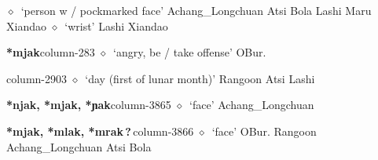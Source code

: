 \hspace{1ex}
         $\diamond$~`person w / pockmarked face'
         Achang\_Longchuan 
\hspace{1ex}
         Atsi 
\hspace{1ex}
         Bola 
\hspace{1ex}
         Lashi 
\hspace{1ex}
         Maru 
\hspace{1ex}
         Xiandao 
\hspace{1ex}
         $\diamond$~`wrist'
         Lashi 
\hspace{1ex}
         Xiandao 
  \item {\footnotesize \textbf{*mjak}}{\tiny column-283}
         $\diamond$~`angry, be / take offense'
         OBur. 
  \item {\footnotesize \textbf{}}{\tiny column-2903}
         $\diamond$~`day (first of lunar month)'
         Rangoon 
\hspace{1ex}
         Atsi 
\hspace{1ex}
         Lashi 
  \item {\footnotesize \textbf{*njak, *mjak, *ɲak}}{\tiny column-3865}
         $\diamond$~`face'
         Achang\_Longchuan 
  \item {\footnotesize \textbf{*mjak, *mlak, *mrak\,?\,}}{\tiny column-3866}
         $\diamond$~`face'
         OBur. 
\hspace{1ex}
         Rangoon 
\hspace{1ex}
         Achang\_Longchuan 
\hspace{1ex}
         Atsi 
\hspace{1ex}
         Bola 
\hspace{1ex}
